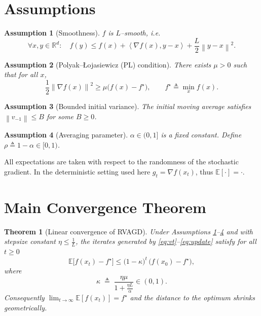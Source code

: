 \documentclass{article}
\newtheorem{theorem}{Theorem}
\newtheorem{assumption}{Assumption}
\newcommand{\E}{\mathbb{E}}
\newcommand{\norm}[1]{\left\|#1\right\|}
\newcommand{\inner}[2]{\left\langle #1,#2\right\rangle}
\newcommand{\grad}{\nabla}
\begin{document}
\newpage
\section*{Assumptions}
\begin{assumption}[Smoothness]\label{ass:smooth}
$f$ is $L$–smooth, i.e.
\[
    \forall x,y\in\mathbb{R}^d:\quad
    f(y)\le f(x)+\inner{\grad f(x)}{y-x}+\frac{L}{2}\norm{y-x}^2 .
\]
\end{assumption}
\begin{assumption}[Polyak–Łojasiewicz (PL) condition]\label{ass:pl}
There exists $\mu>0$ such that for all $x$,
\[
    \frac{1}{2}\norm{\grad f(x)}^2\ge \mu\bigl(f(x)-f^{\star}\bigr),\qquad
    f^{\star}\triangleq\min_x f(x).
\]
\end{assumption}
\begin{assumption}[Bounded initial variance]\label{ass:init}
The initial moving average satisfies $\norm{v_{-1}}\le B$ for some $B\ge 0$.
\end{assumption}
\begin{assumption}[Averaging parameter]\label{ass:alpha}
$\alpha\in(0,1]$ is a fixed constant. Define $\rho\triangleq 1-\alpha\in[0,1)$.
\end{assumption}
All expectations are taken with respect to the randomness of the stochastic gradient. In the deterministic setting used here $g_t=\grad f(x_t)$, thus $\E[\cdot]=\cdot$.

\section*{Main Convergence Theorem}
\begin{theorem}[Linear convergence of RVAGD]\label{thm:linear}
Under Assumptions \ref{ass:smooth}–\ref{ass:alpha} and with stepsize constant $\eta\le \frac{1}{L}$, the iterates generated by \eqref{eq:vt}–\eqref{eq:update} satisfy for all $t\ge 0$
\begin{equation}\label{eq:linear}
    \E\!\bigl[f(x_{t})-f^{\star}\bigr]\le
    \bigl(1-\kappa\bigr)^{t}\,\bigl(f(x_{0})-f^{\star}\bigr),
\end{equation}
where 
\[
    \kappa\; \triangleq\; \frac{\eta\mu}{1+\frac{\eta L}{\alpha}} \in (0,1).
\]
Consequently $\lim_{t\to\infty}\E[f(x_t)]=f^{\star}$ and the distance to the optimum shrinks geometrically.
\end{theorem}
\end{document}
